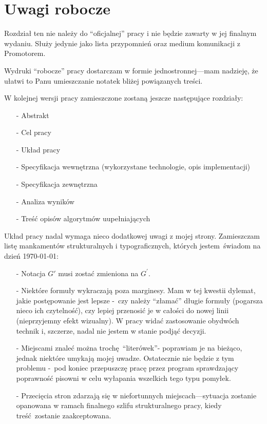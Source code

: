 \chapter{Uwagi robocze}\label{section_notes}
\par{
  Rozdział ten nie należy do ``oficjalnej'' pracy i nie będzie zawarty w jej
 finalnym wydaniu.
 Służy jedynie jako lista przypomnień oraz medium komunikacji z Promotorem.
}
\begin{note}
  Wydruki ``robocze'' pracy dostarczam w formie jednostronnej---mam nadzieję, że
  ułatwi to Panu umieszczanie notatek bliżej powiązanych treści.
\end{note}
\begin{note}
  W kolejnej wersji pracy zamieszczone zostaną jeszcze następujące rozdziały:
  \begin{itemize}
    \item[-] Abstrakt
    \item[-] Cel pracy
    \item[-] Układ pracy
    \item[-] Specyfikacja wewnętrzna (wykorzystane technologie, opis
      implementacji)
    \item[-] Specyfikacja zewnętrzna
    \item[-] Analiza wyników
    \item[-] Treść opisów algorytmów uupełniających
  \end{itemize}
  Układ pracy nadal wymaga nieco dodatkowej uwagi z mojej strony.
  Zamieszczam listę mankamentów strukturalnych i typograficznych, których 
  jestem~świadom na dzień \today:
  \begin{itemize}
    \item[-] Notacja $G\prime$ musi zostać zmieniona na $G^{\prime}$.
    \item[-] Niektóre formuły wykraczają poza marginesy.
      Mam w tej kwestii dylemat, jakie postępowanie jest lepsze -~czy należy
      ``złamać'' długie formuły (pogarsza nieco ich czytelność), czy lepiej 
      przenosić je w całości do nowej linii (nieprzyjemny efekt wizualny).
      W pracy widać zastosowanie obydwóch technik i, szczerze, nadal nie jestem
      w stanie podjąć decyzji.
    \item[-] Miejscami znaleć można trochę ``literówek''- poprawiam je na
      bieżąco, jednak niektóre umykają mojej uwadze.
      Ostatecznie nie będzie z tym problemu -~pod koniec przepuszczę pracę przez
      program sprawdzający poprawność pisowni w celu wyłapania wszelkich tego
      typu pomyłek.
    \item[-] Przecięcia stron zdarzają się w niefortunnych miejscach---sytuacja
      zostanie opanowana w ramach finalnego szlifu strukturalnego pracy, kiedy
      treść~zostanie zaakceptowana.
  \end{itemize}
\end{note}
